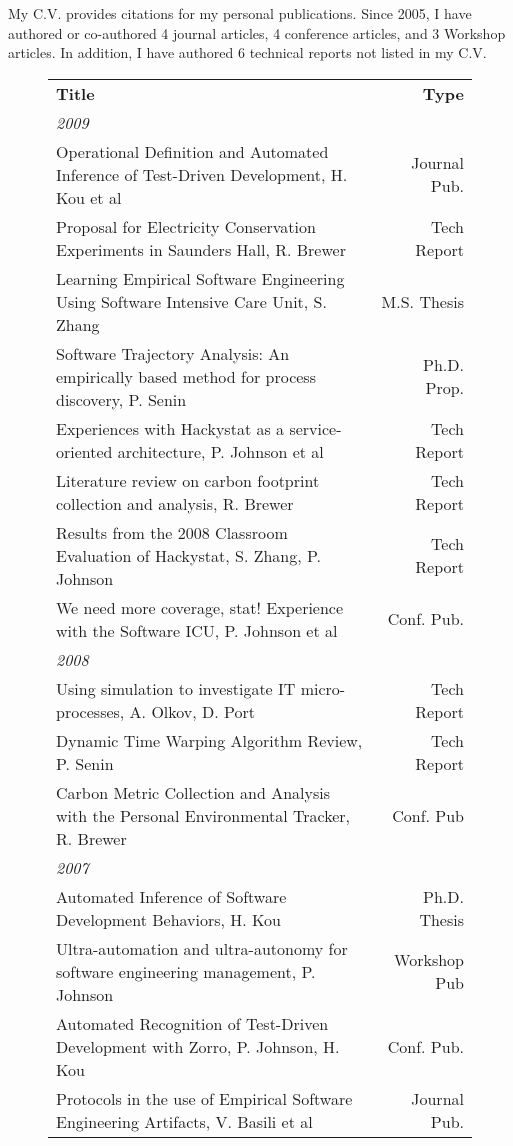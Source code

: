 \documentclass[11pt]{article}
\begin{document}
My C.V. provides citations for my personal publications.  Since 2005, I have authored or co-authored 4 journal articles, 4 conference articles, and 3 Workshop articles. In addition, I have authored 6 technical reports not listed in my C.V.


\begin{figure}[ht]
\small
\begin{tabular}{p{5.5in}r} \hline
{\bf Title} & {\bf Type}  \\
{\em 2009} & \\
Operational Definition and Automated Inference of Test-Driven Development, H. Kou et al  & Journal Pub. \\
Proposal for Electricity Conservation Experiments in Saunders Hall, R. Brewer &  Tech Report \\
Learning Empirical Software Engineering Using Software Intensive Care Unit, S. Zhang  & M.S. Thesis \\
Software Trajectory Analysis: An empirically based method for process discovery, P. Senin  & Ph.D. Prop. \\
Experiences with Hackystat as a service-oriented architecture, P. Johnson et al  & Tech Report \\
Literature review on carbon footprint collection and analysis, R. Brewer  & Tech Report \\
Results from the 2008 Classroom Evaluation of Hackystat, S. Zhang, P. Johnson  & Tech Report \\
We need more coverage, stat! Experience with the Software ICU, P. Johnson et al  & Conf. Pub. \\
{\em 2008} & \\
Using simulation to investigate {IT} micro-processes, A. Olkov, D. Port  & Tech Report \\
Dynamic Time Warping Algorithm Review, P. Senin  & Tech Report \\
Carbon Metric Collection and Analysis with the Personal Environmental Tracker, R. Brewer  & Conf. Pub \\
{\em 2007} & \\
Automated Inference of Software Development Behaviors, H. Kou  & Ph.D. Thesis \\
Ultra-automation and ultra-autonomy for software engineering management, P. Johnson  & Workshop Pub \\
Automated Recognition of Test-Driven Development with Zorro, P. Johnson, H. Kou  & Conf. Pub. \\
Protocols in the use of Empirical Software Engineering Artifacts, V. Basili et al  & Journal Pub. \\

\end{tabular}
\end{figure}
\end{document}
